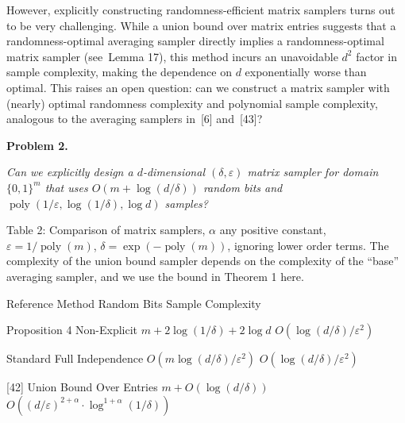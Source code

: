 \documentclass[10pt,a4paper]{article}
\begin{document}



However, explicitly constructing randomness-efficient matrix samplers turns out to be very challenging. While a union bound over matrix entries suggests that a randomness-optimal averaging sampler directly implies a randomness-optimal matrix sampler (see Lemma 17), this method incurs an unavoidable $d^{2}$ factor in sample complexity, making the dependence on $d$ exponentially worse than optimal.
This raises an open question: can we construct a matrix sampler with (nearly) optimal randomness complexity and polynomial sample complexity, analogous to the averaging samplers in [6] and [43]?\par





\par\medskip\noindent\textbf{
\textbf{Problem 2}\textbf{.}
}\par



\emph{Can we explicitly design a $d$-dimensional $(\delta,\varepsilon)$ matrix sampler for domain $\{0,1\}^{m}$ that uses $O(m+\log(d/\delta))$ random bits and $\operatorname*{poly}(1/\varepsilon,\log(1/\delta),\log d)$ samples?}\par





Table 2: Comparison of matrix samplers, $\alpha$ any positive constant, $\varepsilon=1/\operatorname*{poly}(m)$, $\delta=\exp(-\operatorname*{poly}(m))$, ignoring lower order terms. The complexity of the union bound sampler depends on the complexity of the “base” averaging sampler, and we use the bound in Theorem 1 here.




Reference 
Method 
Random Bits 
Sample Complexity 
\par


Proposition 4 
Non-Explicit 
$m+2\log(1/\delta)+2\log d$ 
$O(\log(d/\delta)/\varepsilon^{2})$ 
\par


Standard 
Full Independence 
$O(m\log(d/\delta)/\varepsilon^{2})$ 
$O(\log(d/\delta)/\varepsilon^{2})$ 
\par


[42] 
Union Bound Over Entries 
$m+O(\log(d/\delta))$ 
$O((d/\varepsilon)^{2+\alpha}\cdot\log^{1+\alpha}(1/\delta))$ 
\par
\end{document}
